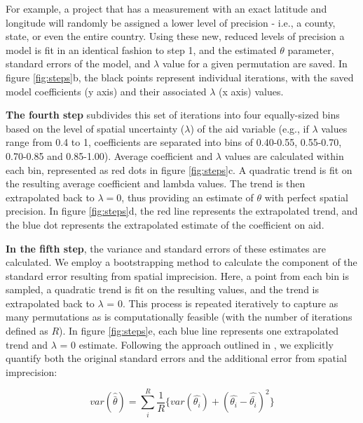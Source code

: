 For example, a project that has a measurement with an exact latitude and longitude will randomly be assigned a lower level of precision - i.e., a county, state, or even the entire country. 
Using these new, reduced levels of precision a model is fit in an identical fashion to step 1, and the estimated $\theta$ parameter, standard errors of the model, and $\lambda$ value for a given permutation are saved.
In figure \ref{fig:steps}b, the black points represent individual iterations, with the saved model coefficients (y axis) and their associated $\lambda$ (x axis) values. 
\par
\textbf{The fourth step} subdivides this set of iterations into four equally-sized bins based on the level of spatial uncertainty ($\lambda$) of the aid variable (e.g., if $\lambda$ values range from 0.4 to 1, coefficients are separated into bins of 0.40-0.55, 0.55-0.70, 0.70-0.85 and 0.85-1.00). 
Average coefficient and $\lambda$ values are calculated within each bin, represented as red dots in figure \ref{fig:steps}c. 
A quadratic trend is fit on the resulting average coefficient and lambda values. 
The trend is then extrapolated back to $\lambda=0$, thus providing an estimate of $\theta$ with perfect spatial precision. 
In figure \ref{fig:steps}d, the red line represents the extrapolated trend, and the blue dot represents the extrapolated estimate of the coefficient on aid. 
\par 

\textbf{In the fifth step}, the variance and standard errors of these estimates are calculated. 
We employ a bootstrapping method to calculate the component of the standard error resulting from spatial imprecision. Here, a point from each bin is sampled, a quadratic trend is fit on the resulting values, and the trend is extrapolated back to $\lambda$ = 0. 
This process is repeated iteratively to capture as many permutations as is computationally feasible (with the number of iterations defined as $R$). 
In figure \ref{fig:steps}e, each blue line represents one extrapolated trend and $\lambda$ = 0 estimate. 
Following the approach outlined in \cite{burnham_information_2002}, we explicitly quantify both the original standard errors and the additional error from spatial imprecision:

\begin{equation}\label{variance}
var(\hat{\bar{\theta}}) = \sum_i^R \frac{1}{R} \{ var(\hat{\theta_i}) + (\hat{\theta_i}-\hat{\bar{\theta_i}})^2 \}
\end{equation}


